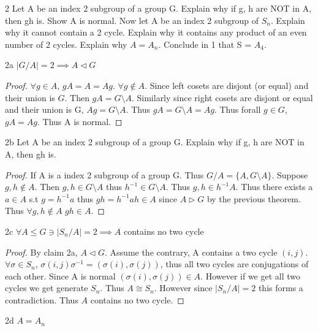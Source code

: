 \documentclass{article}
\begin{document}
\bigskip


\begin{PROB}{2}\label{Problem 2.}
    Let A be an index 2 subgroup of a group G. Explain why if g, h are NOT in A, then gh is. Show A is normal. Now let A be an index 2 subgroup of $S_n$. Explain why it cannot contain a 2 cycle. Explain why it contains any product of an even number of 2 cycles. Explain why $A = A_n$. Conclude in 1 that S = $A_4$.
\end{PROB}
\begin{claim}{2a}
    $|G/A| = 2 \implies A \triangleleft G$
\end{claim}
\begin{proof}
    $\forall g \in A$, $gA = A = Ag$. $\forall g \not \in A$. Since left cosets are disjont (or equal) and their union is $G$. Then $gA = G \setminus A$. Similarly since right cosets are disjont or equal and their union is G, $Ag = G \setminus A$. Thus $gA = G \setminus A = Ag$. Thus forall $g \in G$, $gA = Ag$. Thus A is normal.
\end{proof}
\begin{claim}{2b}
    Let A be an index 2 subgroup of a group G. Explain why if g, h are NOT in A, then gh is.
\end{claim}
\begin{proof}
    If A is a index 2 subgroup of a group G. Thus $G/A = \{A, G \setminus A\}$. Suppose $g, h \not \in A$. Then $g, h \in G \setminus A$ thus $h^{-1} \in G \setminus A$. Thus $g, h \in h^{-1}A$. Thus there exists a $a \in A$ s.t $g = h^{-1}a$ thus $gh = h^{-1}ah \in A$ since $A \triangleright G$ by the previous theorem. Thus $\forall g, h \not \in A$ $gh \in A$. 
\end{proof}
\begin{claim}{2c}
    $\forall A \leq G \ni |S_n/A| = 2 \implies A$ contains no two cycle
\end{claim}
\begin{proof}
    By claim 2a, $A \triangleleft G$.
    Assume the contrary, A contains a two cycle $(i,j)$. $\forall \sigma \in S_n$, $\sigma(i, j)\sigma^{-1} = (\sigma(i), \sigma(j))$, thus all two cycles are conjugations of each other. Since A is normal $(\sigma(i), \sigma(j)) \in A$. However if we get all two cycles we get generate $S_n$. Thus $A \cong S_n$. However since $|S_n/A| = 2$ this forms a contradiction. Thus $A$ contains no two cycle.
\end{proof}
\begin{claim}{2d}
    $A = A_n$
\end{claim}
\end{document}
